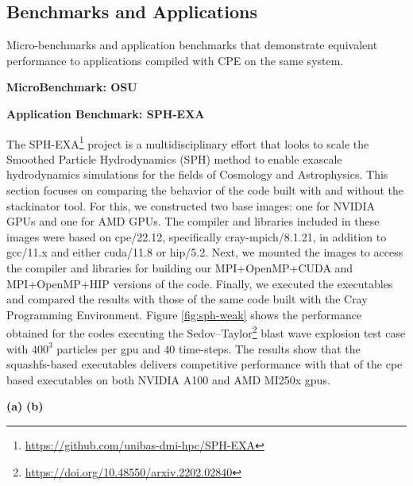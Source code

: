 \subsection{Benchmarks and Applications}


Micro-benchmarks and application benchmarks that demonstrate equivalent performance to applications compiled with CPE on the same system.

\noindent\textbf{MicroBenchmark: OSU}


\noindent\textbf{Application Benchmark: SPH-EXA}

The SPH-EXA\footnote{\url{https://github.com/unibas-dmi-hpc/SPH-EXA}} project is a multidisciplinary effort that looks to scale the Smoothed Particle Hydrodynamics (SPH) method to enable exascale hydrodynamics simulations for the fields of Cosmology and Astrophysics. 
This section focuses on comparing the behavior of the code built with and without the stackinator tool. For this, we constructed two base images: one for NVIDIA GPUs and one for AMD GPUs. The compiler and libraries included in these images were based on cpe/22.12, specifically cray-mpich/8.1.21, in addition to gcc/11.x and either cuda/11.8 or hip/5.2. Next, we mounted the images to access the compiler and libraries for building our MPI+OpenMP+CUDA and MPI+OpenMP+HIP versions of the code. Finally, we executed the executables and compared the results with those of the same code built with the Cray Programming Environment.
Figure \ref{fig:sph-weak} shows the performance obtained for the codes executing the Sedov--Taylor\footnote{\url{https://doi.org/10.48550/arxiv.2202.02840}} blast wave explosion test case with $400^3$ particles per gpu and $40$ time-steps.
The results show that the squashfs-based executables delivers competitive performance with that of the cpe based executables on both NVIDIA A100 and AMD MI250x gpus.

\begin{figure*}[htp!]
    \begin{center}
        
        \hfill
        
        \newline
        \textbf{(a)}
        \hspace{7cm}
        \textbf{(b)}
    \end{center}

    \caption{Weak scaling results on A100 and Mi250x GPU nodes for SPH-EXA (higher is better).}
    \label{fig:sph-weak}
\end{figure*}

